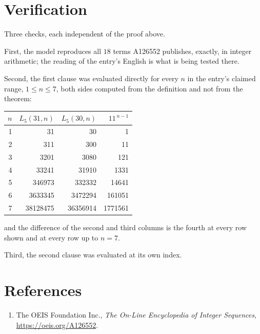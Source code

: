 \documentclass[11pt,a4paper]{article}
\theoremstyle{plain}
\theoremstyle{definition}
\begin{document}
\section{Verification}

Three checks, each independent of the proof above.

First, the model reproduces all $18$ terms A126552 publishes, exactly, in integer
arithmetic; the reading of the entry's English is what is being tested there.

Second, the first clause was evaluated directly for every $n$ in the entry's claimed range,
$1\le n\le7$, both sides computed from the definition and not from the theorem:

\begin{center}
\begin{tabular}{rrrr}
$n$ & $L_{5}(31,n)$ & $L_{5}(30,n)$ & $11^{\,n-1}$ \\ \hline
1 & 31 & 30 & 1 \\
2 & 311 & 300 & 11 \\
3 & 3201 & 3080 & 121 \\
4 & 33241 & 31910 & 1331 \\
5 & 346973 & 332332 & 14641 \\
6 & 3633345 & 3472294 & 161051 \\
7 & 38128475 & 36356914 & 1771561 \\
\end{tabular}
\end{center}

\noindent and the difference of the second and third columns is the fourth at every row shown
and at every row up to $n=7$.

Third, the second clause was evaluated at its own index.

\section*{References}
\begin{enumerate}
\item The OEIS Foundation Inc., \emph{The On-Line Encyclopedia of Integer Sequences},
\url{https://oeis.org/A126552}.
\end{enumerate}
\end{document}
